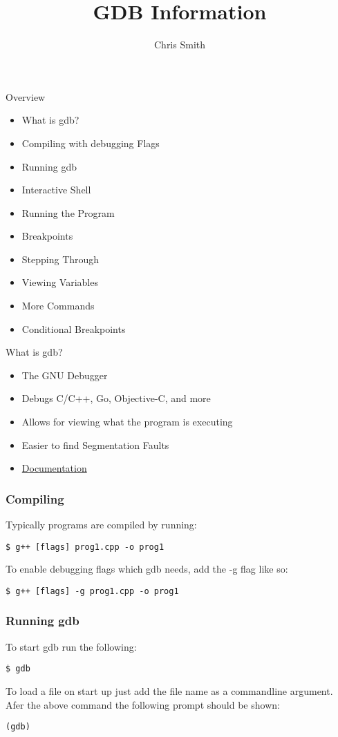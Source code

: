 \documentclass[11pt]{beamer}
\author{Chris Smith}
\title{GDB Information}
\institute{SDSMT ACM/LUG}
\begin{document}
\begin{frame}
\titlepage
\end{frame}

\begin{frame}{Overview}
\begin{itemize}
\item What is gdb?
\item Compiling with debugging Flags
\item Running gdb
\item Interactive Shell
\item Running the Program
\item Breakpoints
\item Stepping Through
\item Viewing Variables
\item More Commands
\item Conditional Breakpoints
\end{itemize}
\end{frame}


\begin{frame}{What is gdb?}
\begin{itemize}
\item The GNU Debugger
\item Debugs C/C++, Go, Objective-C, and more
\item Allows for viewing what the program is executing
\item Easier to find Segmentation Faults
\item \href{https://www.gnu.org/software/gdb/documentation/}{Documentation}
\end{itemize}
\end{frame}

\begin{frame}[fragile]
\frametitle{Compiling}
Typically programs are compiled by running:
\begin{lstlisting}[style=BashInputStyle]
 $ g++ [flags] prog1.cpp -o prog1
\end{lstlisting}
To enable debugging flags which gdb needs, add the -g flag like so:
\begin{lstlisting}[style=BashInputStyle]
 $ g++ [flags] -g prog1.cpp -o prog1
\end{lstlisting}
\end{frame}

\begin{frame}[fragile]
\frametitle{Running gdb}
To start gdb run the following:
\begin{lstlisting}[style=BashInputStyle]
 $ gdb
\end{lstlisting}
 To load a file on start up just add the file name as a commandline argument. \\
 Afer the above command the following prompt should be shown:
\begin{lstlisting}[style=BashInputStyle]
 (gdb)
\end{lstlisting}
\end{frame}
\end{document}
